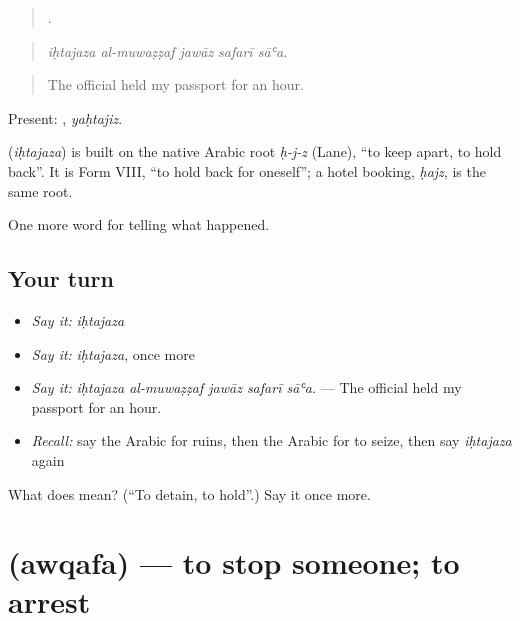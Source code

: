\begin{quote}
    .
\end{quote}

\begin{quote}
\emph{iḥtajaza al-muwaẓẓaf jawāz safarī sāʿa.}
\end{quote}

\begin{quote}
The official held my passport for an hour.
\end{quote}

Present: , \emph{yaḥtajiz}.

\begin{cousinweb}
\textbf{} (\emph{iḥtajaza}) is built on the native Arabic root \emph{ḥ-j-z} (Lane), \textquotedblleft{}to keep apart, to hold back\textquotedblright{}. It is Form VIII, \textquotedblleft{}to hold back for oneself\textquotedblright{}; a hotel booking, \emph{ḥajz}, is the same root.
\end{cousinweb}

\begin{grammarlens}[title={What you've built}]
One more word for telling what happened.
\end{grammarlens}

\subsection*{Your turn}
\begin{itemize}
\raggedright
  \item \emph{Say it:} \emph{iḥtajaza}
  \item \emph{Say it:} \emph{iḥtajaza}, once more
  \item \emph{Say it:} \emph{iḥtajaza al-muwaẓẓaf jawāz safarī sāʿa.} — The official held my passport for an hour.
  \item \emph{Recall:} say the Arabic for ruins, then the Arabic for to seize, then say \emph{iḥtajaza} again
\end{itemize}

\begin{tcolorbox}[breakable,colback=teal!4,colframe=teal!35!black,title={Before you move on}]
What does  mean? (\textquotedblleft{}To detain, to hold\textquotedblright{}.) Say it once more.
\end{tcolorbox}
\section[\texorpdfstring{\ar{أوقف} (awqafa)}{أوقف (awqafa)}]{ (awqafa) — to stop someone; to arrest}

